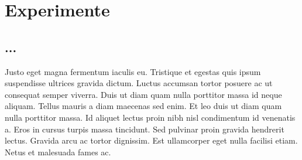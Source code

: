 %
%

\chapter{Experimente}
\label{cha:experiments}

\section{...}
Justo eget magna fermentum iaculis eu. Tristique et egestas quis ipsum suspendisse ultrices gravida dictum. Luctus accumsan tortor posuere ac ut consequat semper viverra. Duis ut diam quam nulla porttitor massa id neque aliquam. Tellus mauris a diam maecenas sed enim. Et leo duis ut diam quam nulla porttitor massa. Id aliquet lectus proin nibh nisl condimentum id venenatis a. Eros in cursus turpis massa tincidunt. Sed pulvinar proin gravida hendrerit lectus. Gravida arcu ac tortor dignissim. Est ullamcorper eget nulla facilisi etiam. Netus et malesuada fames ac.
